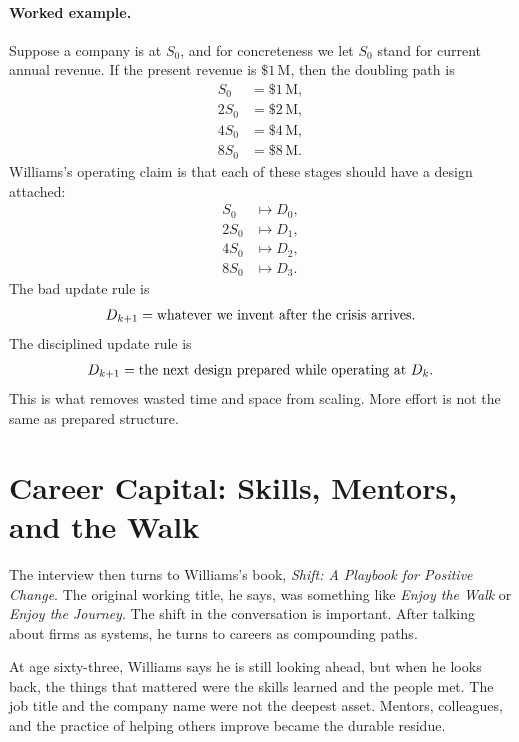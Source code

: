 \paragraph{Worked example.} Suppose a company is at \(S_0\), and for concreteness we let \(S_0\) stand for current annual revenue. If the present revenue is \(\$1\,\mathrm{M}\), then the doubling path is
\begin{align}
S_0 &= \$1\,\mathrm{M},\\
2S_0 &= \$2\,\mathrm{M},\\
4S_0 &= \$4\,\mathrm{M},\\
8S_0 &= \$8\,\mathrm{M}.
\end{align}
Williams's operating claim is that each of these stages should have a design attached:
\begin{align}
S_0 &\mapsto D_0,\\
2S_0 &\mapsto D_1,\\
4S_0 &\mapsto D_2,\\
8S_0 &\mapsto D_3.
\end{align}
The bad update rule is
\begin{equation}
D_{k+1}=\hbox{whatever we invent after the crisis arrives}.
\end{equation}
The disciplined update rule is
\begin{equation}
D_{k+1}=\hbox{the next design prepared while operating at }D_k.
\end{equation}
This is what removes wasted time and space from scaling. More effort is not the same as prepared structure.

\section{Career Capital: Skills, Mentors, and the Walk}

The interview then turns to Williams's book, \emph{Shift: A Playbook for Positive Change}. The original working title, he says, was something like \emph{Enjoy the Walk} or \emph{Enjoy the Journey}. The shift in the conversation is important. After talking about firms as systems, he turns to careers as compounding paths.

At age sixty-three, Williams says he is still looking ahead, but when he looks back, the things that mattered were the skills learned and the people met. The job title and the company name were not the deepest asset. Mentors, colleagues, and the practice of helping others improve became the durable residue.

